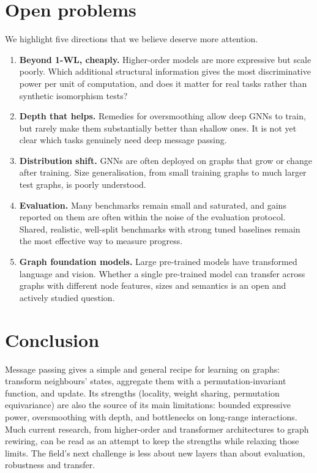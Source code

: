 \documentclass[11pt]{article}
\theoremstyle{plain}
\theoremstyle{definition}
\begin{document}
\section{Open problems}
\label{sec:open}

We highlight five directions that we believe deserve more attention.

\begin{enumerate}
  \item \textbf{Beyond 1-WL, cheaply.} Higher-order models are more expressive but scale poorly. Which additional structural information gives the most discriminative power per unit of computation, and does it matter for real tasks rather than synthetic isomorphism tests?
  \item \textbf{Depth that helps.} Remedies for oversmoothing allow deep GNNs to train, but rarely make them substantially better than shallow ones. It is not yet clear which tasks genuinely need deep message passing.
  \item \textbf{Distribution shift.} GNNs are often deployed on graphs that grow or change after training. Size generalisation, from small training graphs to much larger test graphs, is poorly understood.
  \item \textbf{Evaluation.} Many benchmarks remain small and saturated, and gains reported on them are often within the noise of the evaluation protocol. Shared, realistic, well-split benchmarks with strong tuned baselines remain the most effective way to measure progress.
  \item \textbf{Graph foundation models.} Large pre-trained models have transformed language and vision. Whether a single pre-trained model can transfer across graphs with different node features, sizes and semantics is an open and actively studied question.
\end{enumerate}

\section{Conclusion}
\label{sec:conclusion}

Message passing gives a simple and general recipe for learning on graphs: transform neighbours' states, aggregate them with a permutation-invariant function, and update. Its strengths (locality, weight sharing, permutation equivariance) are also the source of its main limitations: bounded expressive power, oversmoothing with depth, and bottlenecks on long-range interactions. Much current research, from higher-order and transformer architectures to graph rewiring, can be read as an attempt to keep the strengths while relaxing those limits. The field's next challenge is less about new layers than about evaluation, robustness and transfer.



\end{document}
